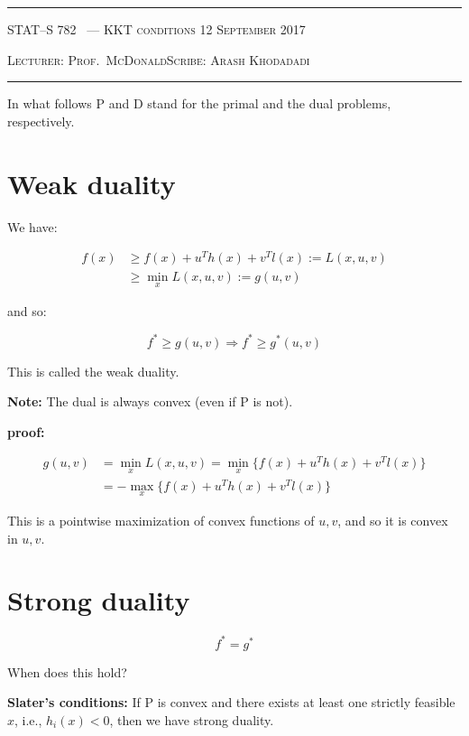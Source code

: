 \documentclass[10pt]{article}
\newcounter{lecnum}
\newcommand{\lecturer}{Prof.\ McDonald}
\newcommand{\scribe}{Arash Khodadadi}
\newcommand{\chtitle}{KKT conditions}
\newcommand{\lecdate}{12 September 2017}
\begin{document}
\rule{6.5in}{1pt}

\textsc{STAT--S 782
        \hfill \thelecnum\ --- \chtitle
        \hfill \lecdate}

\textsc{Lecturer: \lecturer \hfill Scribe: \scribe}
\rule{6.5in}{1pt}

In what follows P and D stand for the primal and the dual problems, respectively.

\section{Weak duality}
We have:

\begin{equation}
\begin{aligned}
	f(x) & \ge  f(x)+u^Th(x)+v^Tl(x):=L(x,u,v)\\
		 & \ge  \min_x L(x,u,v):=g(u,v)
\end{aligned}
\end{equation}

\noindent and so:

\begin{equation}
	f^* \ge g(u,v) \Longrightarrow f^* \ge g^*(u,v)
\end{equation}

This is called the weak duality.

\textbf{Note:} The dual is always convex (even if P is not).

\textbf{proof:}

\begin{equation}
\begin{aligned}
 g(u,v) & =\min_x L(x,u,v)= \min_x \{ f(x)+u^Th(x)+v^Tl(x) \}\\
 		& =-\max_x \{ f(x)+u^Th(x)+v^Tl(x) \}
\end{aligned}
\end{equation}

This is a pointwise maximization of convex functions of $u,v$, and so it is convex in $u,v$.

\section{Strong duality}

\begin{equation}
f^*=g^*
\end{equation}

When does this hold?

\textbf{Slater's conditions:} If P is convex and there exists at least one strictly feasible $x$, i.e., $h_i(x)<0$, then we have strong duality.
\end{document}
